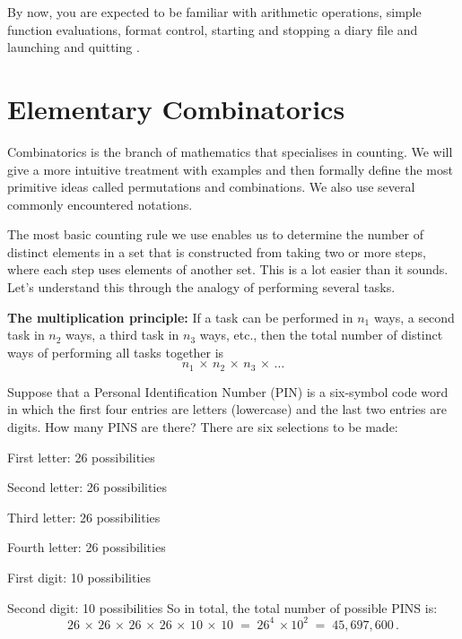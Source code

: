 By now, you are expected to be familiar with arithmetic operations, simple function evaluations, format control, starting and stopping a diary file and launching and quitting \Matlab.
 
\section{Elementary Combinatorics}\label{S:PermsFactsCombs}

Combinatorics is the branch of mathematics that specialises in counting. 
We will give a more intuitive treatment with examples and then formally define the most primitive ideas called permutations and combinations. We also use several commonly encountered notations.

The most basic counting rule we use enables us to determine the number of distinct elements in a set that is constructed from taking two or more steps, where each step uses elements of another set. 
This is a lot easier than it sounds. Let's understand this through the analogy of performing several tasks.

\begin{framed}{\bf The multiplication principle:}
If a task can be performed in $n_1$ ways, a second task in $n_2$ ways, a
third task in $n_3$ ways, etc., then the total number of distinct ways
of performing all tasks together is
\[n_1\,\times\,n_2\,\times\,n_3\,\times\, \dots  \]
\end{framed}

\begin{example}\label{EX:unrestrictedPIN}
Suppose that a Personal Identification Number (PIN) is a six-symbol code word in which the first four entries are letters (lowercase) and the last two entries are digits. 
How many PINS are there? There are six selections to be made:
\bit
\item[] First letter: 26 possibilities
\item[] Second letter: 26 possibilities
\item[] Third letter: 26 possibilities
\item[] Fourth letter: 26 possibilities
\item[] First digit: 10 possibilities
\item[] Second digit: 10 possibilities
\eit\ecols
So in total, the total number of possible PINS is:
\[ 26\,\times\,26 \,\times\,26\,\times\,26\,\times\,10\,\times\,10\;=\;
26^4\,\times 10^2 \;=\;45,697,600\,.\]
\end{example}

